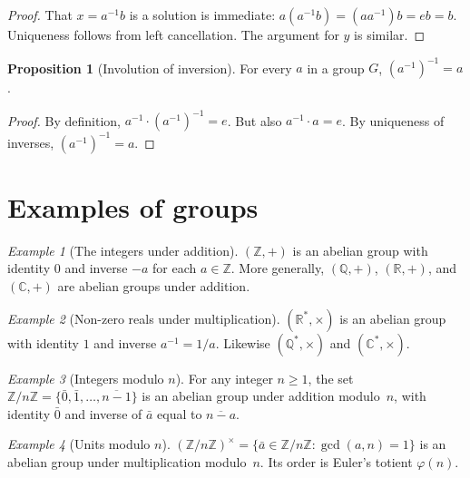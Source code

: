 \documentclass[12pt,a4paper,openany]{book}
\theoremstyle{definition}
\newtheorem{proposition}{Proposition}[chapter]
\theoremstyle{remark}
\newtheorem{example}{Example}[chapter]
\newcommand{\Z}{\mathbb{Z}}
\newcommand{\Q}{\mathbb{Q}}
\newcommand{\R}{\mathbb{R}}
\newcommand{\C}{\mathbb{C}}
\renewcommand{\gcd}{\operatorname{gcd}}
\begin{document}
\begin{proof}
That $x = a^{-1}b$ is a solution is immediate: $a(a^{-1}b) = (aa^{-1})b =
eb = b$.  Uniqueness follows from left cancellation.  The argument for $y$
is similar.
\end{proof}

\begin{proposition}[Involution of inversion]
\label{prop:double-inverse}
For every $a$ in a group $G$, $(a^{-1})^{-1}=a$.
\end{proposition}

\begin{proof}
By definition, $a^{-1}\cdot(a^{-1})^{-1} = e$.  But also $a^{-1}\cdot a =
e$.  By uniqueness of inverses, $(a^{-1})^{-1} = a$.
\end{proof}

\section{Examples of groups}
\label{sec:ch1-examples}

\begin{example}[The integers under addition]
\label{ex:Z-add}
$(\Z,+)$ is an abelian group with identity $0$ and inverse $-a$ for each
$a\in\Z$.  More generally, $(\Q,+)$, $(\R,+)$, and $(\C,+)$ are abelian
groups under addition.
\end{example}

\begin{example}[Non-zero reals under multiplication]
\label{ex:Rstar-mult}
$(\R^*,\times)$ is an abelian group with identity $1$ and inverse $a^{-1} =
1/a$.  Likewise $(\Q^*,\times)$ and $(\C^*,\times)$.
\end{example}

\begin{example}[Integers modulo $n$]
\label{ex:Zn-add}
For any integer $n\ge 1$, the set $\Z/n\Z = \{\bar 0, \bar 1, \ldots,
\overline{n-1}\}$ is an abelian group under addition modulo~$n$, with
identity $\bar 0$ and inverse of $\bar a$ equal to $\overline{n-a}$.
\end{example}

\begin{example}[Units modulo $n$]
\label{ex:Zn-units}
$(\Z/n\Z)^\times = \{\bar a\in\Z/n\Z : \gcd(a,n)=1\}$ is an abelian group
under multiplication modulo~$n$.  Its order is Euler's totient
$\varphi(n)$.
\end{example}
\end{document}
